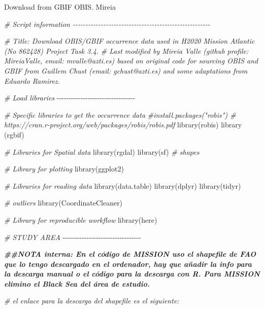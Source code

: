 \documentclass[
]{book}
\newenvironment{Shaded}{\begin{snugshade}}{\end{snugshade}}
\newcommand{\CommentTok}[1]{\textcolor[rgb]{0.56,0.35,0.01}{\textit{#1}}}
\newcommand{\DocumentationTok}[1]{\textcolor[rgb]{0.56,0.35,0.01}{\textbf{\textit{#1}}}}
\newcommand{\FunctionTok}[1]{\textcolor[rgb]{0.00,0.00,0.00}{#1}}
\newcommand{\NormalTok}[1]{#1}
\newcommand{\SpecialCharTok}[1]{\textcolor[rgb]{0.00,0.00,0.00}{#1}}
\begin{document}
Download from GBIF OBIS. Mireia

\begin{Shaded}
\begin{Highlighting}[]
\CommentTok{\# Script information {-}{-}{-}{-}{-}{-}{-}{-}{-}{-}{-}{-}{-}{-}{-}{-}{-}{-}{-}{-}{-}{-}{-}{-}{-}{-}{-}{-}{-}{-}{-}{-}{-}{-}{-}{-}{-}{-}{-}{-}{-}{-}{-}{-}{-}{-}{-}{-}{-}{-}{-}{-}{-}{-}}

\CommentTok{\# Title: Download OBIS/GBIF occurrence data used in H2020 Mission Atlantic (No 862428) Project Task 3.4.}
\CommentTok{\# Last modified by Mireia Valle (github profile: MireiaValle, email: mvalle@azti.es) based on original code for sourcing OBIS and GBIF from Guillem Chust (email: gchust@azti.es) and some adaptations from Eduardo Ramirez. }

\CommentTok{\# Load libraries }
\SpecialCharTok{{-}{-}{-}{-}{-}{-}{-}{-}{-}{-}{-}{-}{-}{-}{-}{-}{-}{-}{-}{-}{-}{-}{-}{-}{-}{-}{-}{-}{-}{-}{-}{-}{-}}
  
\CommentTok{\# Specific libraries to get the occurrence data}
\CommentTok{\#install.packages("robis") \# https://cran.r{-}project.org/web/packages/robis/robis.pdf}
\FunctionTok{library}\NormalTok{(robis)}
\FunctionTok{library}\NormalTok{ (rgbif)}

\CommentTok{\# Libraries for Spatial data }
\FunctionTok{library}\NormalTok{(rgdal)}
\FunctionTok{library}\NormalTok{(sf) }\CommentTok{\# shapes}

\CommentTok{\# Library for plotting}
\FunctionTok{library}\NormalTok{(ggplot2)}

\CommentTok{\# Libraries for reading data}
\FunctionTok{library}\NormalTok{(data.table)}
\FunctionTok{library}\NormalTok{(dplyr)}
\FunctionTok{library}\NormalTok{(tidyr)}

\CommentTok{\# outliers}
\FunctionTok{library}\NormalTok{(CoordinateCleaner)}

\CommentTok{\# Library for reproducible workflow}
\FunctionTok{library}\NormalTok{(here)}


\CommentTok{\# STUDY AREA}
\SpecialCharTok{{-}{-}{-}{-}{-}{-}{-}{-}{-}{-}{-}{-}{-}{-}{-}{-}{-}{-}{-}{-}{-}{-}{-}{-}{-}{-}{-}{-}{-}{-}{-}{-}{-}}

\DocumentationTok{\#\#NOTA interna: En el código de MISSION uso el shapefile de FAO que lo tengo descargado en el ordenador, hay que añadir la info para la descarga manual o el código para la descarga con R. Para MISSION elimino el Black Sea del área de estudio. }
  
\CommentTok{\# el enlace para la descarga del shapefile es el siguiente: }
 

\end{Highlighting}
\end{Shaded}
\end{document}
